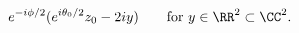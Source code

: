 \begin{equation*}
  e^{-i\phi/2} (e^{i\theta_0/2} z_0 - 2i y)\qquad\text{for $y \in \RR^2
  \subset \CC^2$.}
\end{equation*}

